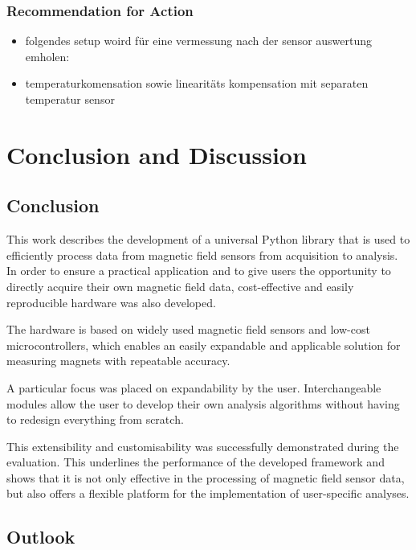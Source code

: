 \hypertarget{recommendation-for-action}{%
\subsection{Recommendation for Action}\label{recommendation-for-action}}

\begin{itemize}
\tightlist
\item
  folgendes setup woird für eine vermessung nach der sensor auswertung
  emholen:
\item
  temperaturkomensation sowie linearitäts kompensation mit separaten
  temperatur sensor
\end{itemize}

\hypertarget{conclusion-and-discussion}{%
\chapter{Conclusion and Discussion}\label{conclusion-and-discussion}}

\hypertarget{conclusion}{%
\section{Conclusion}\label{conclusion}}

This work describes the development of a universal Python library that
is used to efficiently process data from magnetic field sensors from
acquisition to analysis. In order to ensure a practical application and
to give users the opportunity to directly acquire their own magnetic
field data, cost-effective and easily reproducible hardware was also
developed.

The hardware is based on widely used magnetic field sensors and low-cost
microcontrollers, which enables an easily expandable and applicable
solution for measuring magnets with repeatable accuracy.

A particular focus was placed on expandability by the user.
Interchangeable modules allow the user to develop their own analysis
algorithms without having to redesign everything from scratch.

This extensibility and customisability was successfully demonstrated
during the evaluation. This underlines the performance of the developed
framework and shows that it is not only effective in the processing of
magnetic field sensor data, but also offers a flexible platform for the
implementation of user-specific analyses.

\hypertarget{outlook}{%
\section{Outlook}\label{outlook}}

